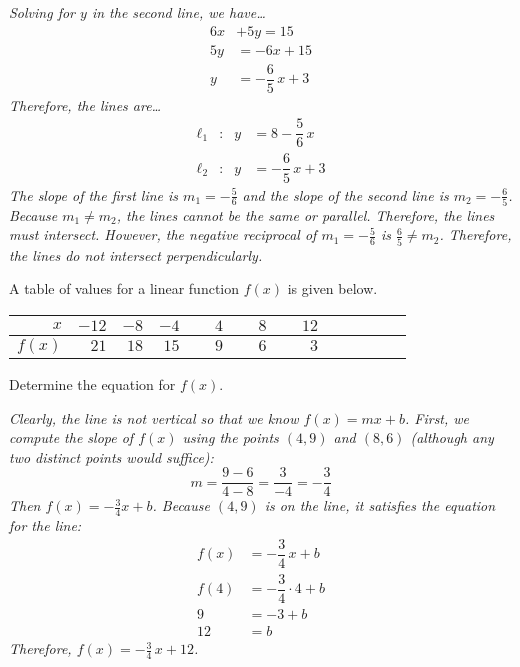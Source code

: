 \documentclass[12pt,letterpaper]{exam}
\begin{document}
\begin{questions}
{\itshape Solving for $y$ in the second line, we have\dots \pspace
	\[
	\begin{aligned}
	6x &+ 5y= 15 \\[0.3cm]
	5y&= -6x + 15 \\[0.3cm]
	y&= -\dfrac{6}{5}\,x + 3
	\end{aligned}
	\] \pspace
Therefore, the lines are\dots \pspace
	\[
	\begin{aligned}
	\ell_1&: & y&= 8 - \dfrac{5}{6}\,x \\
	\ell_2&: & y&= -\dfrac{6}{5}\,x + 3
	\end{aligned}
	\]  \pspace
The slope of the first line is $m_1= -\frac{5}{6}$ and the slope of the second line is $m_2= -\frac{6}{5}$. Because $m_1 \neq m_2$, the lines cannot be the same or parallel. Therefore, the lines must intersect. However, the negative reciprocal of $m_1= -\frac{5}{6}$ is $\frac{6}{5} \neq m_2$. Therefore, the lines do not intersect perpendicularly. 
}



\newpage



\newpage
\question[6] A table of values for a linear function $f(x)$ is given below.
	\begin{table}[!ht]
	\centering
	\begin{tabular}{r||rrrrrrrrrrr}
	$x$ & $-12$ & $-8$ & $-4$ & $\phantom{-}4$ & $\phantom{-}8$ & $\phantom{-}12$ \\ \hline
	$f(x)$ & $21$ & $18$ & $15$ & $9$ & $6$ & $3$
	\end{tabular}
	\end{table} \par
Determine the equation for $f(x)$. \pspace

{\itshape Clearly, the line is not vertical so that we know $f(x)= mx + b$. First, we compute the slope of $f(x)$ using the points $(4, 9)$ and $(8, 6)$ (although any two distinct points would suffice):
	\[
	m= \dfrac{9 - 6}{4 - 8}= \dfrac{3}{-4}= -\dfrac{3}{4}
	\]
Then $f(x)= -\frac{3}{4}x + b$. Because $(4, 9)$ is on the line, it satisfies the equation for the line:
	\[
	\begin{aligned}
	f(x)&= -\dfrac{3}{4}\,x + b \\[0.3cm]
	f(4)&= -\dfrac{3}{4} \cdot 4 + b \\[0.3cm]
	9&= -3 + b \\[0.3cm]
	12&= b
	\end{aligned}
	\]
Therefore, $f(x)= -\frac{3}{4}\,x + 12$. 
}




\end{questions}
\end{document}
